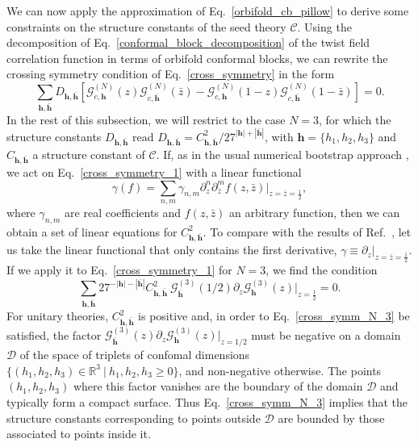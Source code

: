 \documentclass[a4paper,11pt]{article}
\begin{document}
We can now apply the approximation of Eq.~\eqref{orbifold_cb_pillow} to derive 
some constraints on the structure constants of the seed theory $\mathcal{C}$.
Using the decomposition of Eq.~\eqref{conformal_block_decomposition} of the twist field correlation function 
in terms of orbifold conformal blocks, we can rewrite the crossing symmetry condition 
of Eq.~\eqref{cross_symmetry} in the form
\begin{equation}\label{cross_symmetry_1}
 \sum_{\boldsymbol{h}, \boldsymbol{\bar{h}}} D_{\boldsymbol{h}, \boldsymbol{\bar{h}}}\left[
 \mathcal{G}_{c, \boldsymbol{h}}^{(N)}(z)\mathcal{G}_{c, \boldsymbol{\bar{h}}}^{(N)}(\bar{z})-
 \mathcal{G}_{c, \boldsymbol{h}}^{(N)}(1-z)\mathcal{G}_{c, \boldsymbol{\bar{h}}}^{(N)}(1-\bar{z})\right]=0.
\end{equation}
In the rest of this subsection, we will restrict to the case $N=3$, for which the structure constants 
$D_{\boldsymbol{h}, \boldsymbol{\bar{h}}}$ read $D_{\boldsymbol{h},\boldsymbol{\bar{h}}}
=C_{\boldsymbol{h}, \boldsymbol{\bar{h}}}^2/27^{|\boldsymbol{h}|+|\boldsymbol{\bar{h}}|}$, 
with $\boldsymbol{h}=\{h_1, h_2, h_3\}$ and $C_{\boldsymbol{h}, \boldsymbol{\bar{h}}}$ a 
structure constant of $\mathcal{C}$. If, as in the usual numerical bootstrap approach \cite{Rattazzi, Poland}, 
we act on Eq.~\eqref{cross_symmetry_1} with a linear functional
\begin{equation}
 \gamma(f)=\sum_{n, m} \gamma_{n, m}\partial_{z}^n\partial_{\bar{z}}^m f(z,\bar{z})\Bigr|_{z=\bar{z}=\frac{1}{2}},
\end{equation}
where $\gamma_{n, m}$ are real coefficients and $f(z,\bar{z})$ an arbitrary function, then 
we can obtain a set of linear equations for $C_{\boldsymbol{h}, \boldsymbol{\bar{h}}}^2$.
To compare with the results of Ref.~\cite{Collier}, let us take the linear functional that only 
contains the first derivative, $\gamma\equiv\partial_z|_{z=\bar{z}=\frac{1}{2}}$. If we apply it to 
Eq.~\eqref{cross_symmetry_1} for $N=3$, we find the condition
\begin{equation}\label{cross_symm_N_3}
 \sum_{\boldsymbol{h},\boldsymbol{\bar{h}}} 27^{-|\boldsymbol{h}|-|\boldsymbol{\bar{h}}|}
 C_{\boldsymbol{h}, \boldsymbol{\bar{h}}}^2~\mathcal{G}_{\boldsymbol{\bar{h}}}^{(3)}\left(1/2\right)
 \partial_z\mathcal{G}_{\boldsymbol{h}}^{(3)}(z)\Bigr|_{z=\frac{1}{2}}=0.
\end{equation}
For unitary theories, $C_{\boldsymbol{h}, \boldsymbol{\bar{h}}}^2$ is positive and, 
in order to Eq.~\eqref{cross_symm_N_3} be satisfied, the factor $\mathcal{G}_{\boldsymbol{\bar{h}}}^{(3)}(z)
\partial_z\mathcal{G}_{\boldsymbol{h}}^{(3)}(z)\bigr|_{z=1/2}$ must be negative on a domain $\mathscr{D}$
of the space of triplets of confomal dimensions $\{(h_1, h_2, h_3)\in \mathbb{R}^3~|~h_1, h_2, h_3\geq 0\}$,
and non-negative otherwise. The points $(h_1, h_2, h_3)$ where this factor vanishes are the boundary
of the domain $\mathscr{D}$ and typically form a compact surface. Thus Eq.~\eqref{cross_symm_N_3} implies that the structure constants 
corresponding to points outside $\mathscr{D}$ are bounded by those associated to points inside it. 
\end{document}
